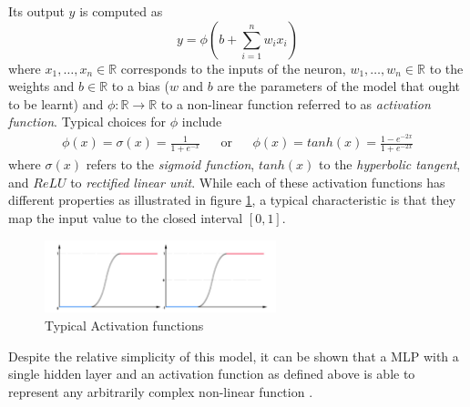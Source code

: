 Its output $y$ is computed as 
\begin{equation}
	y = \phi(b + \sum_{i=1}^{n} w_i x_i)
\end{equation}
where $x_1, \ldots, x_n \in \mathbb{R}$ corresponds to the inputs of the neuron, $w_1, \dots, w_n\in \mathbb{R}$ to the weights and $b \in \mathbb{R}$ to a bias ($w$ and  $b$ are the parameters of the model that ought to be learnt) and $\phi: \mathbb{R} \rightarrow \mathbb{R}$ to a non-linear function referred to as \emph{activation function}. Typical choices for $\phi$ include 
\begin{align*} 
\phi(x) = \sigma(x) = \frac{1}{1 + e^{-x}} && \text{or} && \phi(x) = tanh(x) = \frac{1  - e^{-2x}}{1  + e^{-2x}}
\end{align*} 
where $\sigma(x)$ refers to the \emph{sigmoid function}, $tanh(x)$ to the \emph{hyperbolic tangent}, and $ReLU$ to \emph{rectified linear unit}. While each of these activation functions has different properties as illustrated in figure \ref{fig:activation-functions}, a typical characteristic is that they map the input value to the closed interval $[0, 1]$. 

\begin{figure}[h]
	\caption{Typical Activation functions}\label{fig:activation-functions}   
	\centering
	\includegraphics[width=0.6\textwidth]{figures/chapter-2/activation-functions.png}
\end{figure}


%

Despite the relative simplicity of this model, it can be shown that a MLP with a single hidden layer and an activation function as defined above is able to represent any arbitrarily complex non-linear function \cite{mlp-power}.

